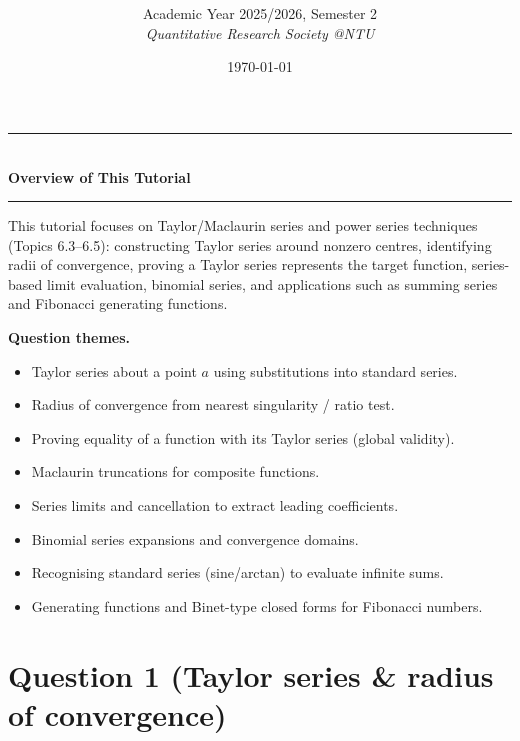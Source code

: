 \documentclass[12pt]{article}
\title{
\CourseCode\ \CourseName \\[0.3em]
\large \DocType
}
\author{
  Academic Year 2025/2026, Semester 2 \\[0.25em]
  \textit{Quantitative Research Society @NTU}
}
\date{\today}
\begin{document}
\maketitle
\thispagestyle{plainfirst}
\pagestyle{main}
\bigskip

\begin{center}
  \rule{0.8\textwidth}{0.4pt}\\[4pt]
  \textbf{Overview of This Tutorial}\\[2pt]
  \rule{0.8\textwidth}{0.4pt}
\end{center}

\noindent
This tutorial focuses on Taylor/Maclaurin series and power series techniques (Topics 6.3--6.5): constructing Taylor series around nonzero centres, identifying radii of convergence, proving a Taylor series represents the target function, series-based limit evaluation, binomial series, and applications such as summing series and Fibonacci generating functions.

\noindent
\textbf{Question themes.}
\begin{itemize}[leftmargin=*]
  \item Taylor series about a point \(a\) using substitutions into standard series.
  \item Radius of convergence from nearest singularity / ratio test.
  \item Proving equality of a function with its Taylor series (global validity).
  \item Maclaurin truncations for composite functions.
  \item Series limits and cancellation to extract leading coefficients.
  \item Binomial series expansions and convergence domains.
  \item Recognising standard series (sine/arctan) to evaluate infinite sums.
  \item Generating functions and Binet-type closed forms for Fibonacci numbers.
\end{itemize}

\bigskip

\newpage
\section*{Question 1 (Taylor series \& radius of convergence)}
\end{document}
